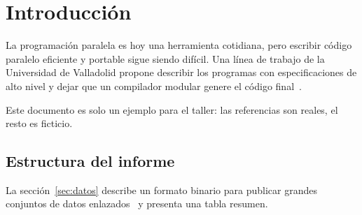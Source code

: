 %

\section{Introducción}

La programación paralela es hoy una herramienta cotidiana, pero escribir
código paralelo eficiente y portable sigue siendo difícil. Una línea de
trabajo de la Universidad de Valladolid propone describir los programas
con especificaciones de alto nivel y dejar que un compilador modular
genere el código final~\cite{gonzalez2011trasgo}.

%

\begin{aviso}
  Este documento es solo un ejemplo para el taller: las referencias son
  reales, el resto es ficticio.
\end{aviso}

\subsection{Estructura del informe}
La sección~\ref{sec:datos} describe un formato binario para publicar
grandes conjuntos de datos enlazados~\cite{fernandez2013hdt} y
presenta una tabla resumen.
